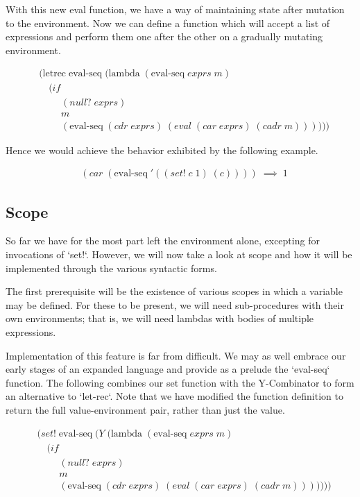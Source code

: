 With this new eval function, we have a way of maintaining state after 
mutation to the environment. Now we can define a function which will accept
a list of expressions and perform them one after the other on a gradually
mutating environment.

\begin{align*}
& (\text{letrec} \; \text{eval-seq} \; (\text{lambda} \; (\text{eval-seq} \; exprs \; m)
\\& \quad (if
\\& \qquad \; (null? \; exprs)
\\& \qquad \; m
\\& \qquad \; (\text{eval-seq} \; (cdr \; exprs) \; (eval \; (car \; exprs) \; (cadr \; m))))))
\end{align*}

Hence we would achieve the behavior exhibited by the following
example.

\begin{align*}
& (car \; (\text{eval-seq} \; '((set! \; c \; 1) \; (c)))) \; \implies \; 1
\end{align*}

\subsection{Scope}
So far we have for the most part left the environment alone, excepting for
invocations of `set!`. However, we will now take a look at scope and how it
will be implemented through the various syntactic forms.

The first prerequisite will be the existence of various scopes in which a
variable may be defined. For these to be present, we will need sub-procedures
with their own environments; that is, we will need lambdas with bodies of
multiple expressions.

Implementation of this feature is far from difficult. We may as well embrace
our early stages of an expanded language and provide as a prelude the 
`eval-seq` function. The following combines our set function with the
Y-Combinator to form an alternative to `let-rec`. Note that we have modified
the function definition to return the full value-environment pair, rather 
than just the value.

\begin{align*}
& (set! \; \text{eval-seq} \; (Y \; (\text{lambda} \; (\text{eval-seq} \; exprs \; m)
\\& \quad (if
\\& \qquad \; (null? \; exprs)
\\& \qquad \; m
\\& \qquad \; (\text{eval-seq} \; (cdr \; exprs) \; (eval \; (car \; exprs) \; (cadr \; m)))))))
\end{align*}

